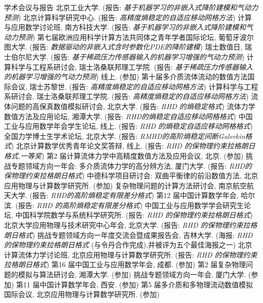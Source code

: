 %
\begin{rubric}{\songti 学术会议与报告}
%
\entry*[2023, 07.07] 北京工业大学. (报告: \emph{基于机器学习的非嵌入式降阶建模和气动力预测})
%
\entry*[2023, 07.06] 北京计算科学研究中心. (报告: \emph{高精度熵稳定的自适应移动网格方法})
%
\entry*[2023, 07.01] 计算与应用数学讨论班, 南方科技大学. (报告: \emph{基于机器学习的非嵌入式降阶建模和气动力预测})
%
\entry*[2023, 6.19-6.21] 第七届欧洲应用科学计算方法共同体之青年学者国际论坛, 葡萄牙波尔图大学. (报告: \emph{数据驱动的非嵌入式含时参数化PDE的降阶建模})
%
\entry*[2023, 6.07] 瑞士数值日, 瑞士伯尔尼大学. (报告: \emph{基于稀疏压力传感器输入的机器学习增强的气动力预测})
%
\entry*[2023, 6.05-6.06] 计算科学与工程系研讨会, 瑞士洛桑联邦理工学院. (报告: \emph{基于稀疏压力传感器输入的机器学习增强的气动力预测})
%
\entry*[] 线上. (参加)
%
\entry*[2022, 8.22-8.26] 第十届多介质流体流动的数值方法国际会议, 瑞士苏黎世. (报告: \emph{高精度熵稳定的自适应移动网格方法})
%
\entry*[2022, 6.27-6.29] 计算科学与工程系研讨会, 瑞士洛桑联邦理工学院. (报告: \emph{高精度熵稳定的自适应移动网格方法})
%
\entry*[2021, 6.05-6.07] 流体问题的高保真数值模拟研讨会, 北京大学. (报告: \emph{RHD 的熵稳定格式})
%
\entry*[2020, 12.11-12.13] 流体力学数值方法及应用论坛, 湘潭大学. (报告: \emph{RHD的熵稳定自适应移动网格格式})
%
\entry*[2020, 11.14-11.15] 中国工业与应用数学年会学生论坛, 线上. (报告: \emph{RHD 的熵稳定自适应移动网格格式})
%
\entry*[2020, 11.06-11.08] 全国力学博士生学术论坛, 北京大学. (报告: \emph{RMHD的高阶熵稳定间断Galerkin格式})
%
\entry*[2020, 8.30] 北京计算数学优秀青年论文奖答辩, 线上. (报告: \emph{RHD 的保物理约束拉格朗日格式,一等奖})
%
\entry*[2020, 1.10-1.13] 第2 届计算流体力学中高精度数值方法及应用会议, 北京. (参加)
%
\entry*[2019, 11.29-12.01] 挑战专题领域方向一年会: 多介质流体力学的高分辨方法, 厦门大学. (报告: \emph{RHD的保物理约束拉格朗日格式})
%
\entry*[2019, 9.25-9.27] 中德科学项目研讨会: 双曲平衡律的前沿数值方法, 北京应用物理与计算数学研究所. (参加)
%
\entry*[2020, 8.28-8.30] 复杂物理问题的计算方法研讨会, 南京航空航天大学. (报告: \emph{RHD的高阶熵稳定有限差分格式})
%
\entry*[2019, 7.31-8.04] 第12 届中国计算数学年会, 哈尔滨. (报告: \emph{RHD 的高阶熵稳定有限差分格式})
%
\entry*[2019, 6.22] 中国工业与应用数学学会研究生论坛, 中国科学院数学与系统科学研究所. (报告: \emph{RHD 的保物理约束拉格朗日格式})
%
\entry*[2018, 12.13] 北京大学应用物理与技术研究中心年会, 北京大学. (报告: \emph{RHD 的保物理约束拉格朗日格式})
%
\entry*[2018, 11.17-11.19] 挑战专题领域方向一年度交流会暨成果报告会, 吉林大学. (海报: \emph{RHD 的保物理约束拉格朗日格式} (与令丹合作完成),并被评为五个最佳海报之一)
%
\entry*[2018, 11.11] 北京计算流体力学讨论班, 北京应用物理与计算数学研究所. (报告: \emph{RHD 的保物理约束拉格朗日格式})
%
\entry*[2018, 9.13-9.16] 第16 届中国工业与应用数学年会, 成都. (参加)
%
\entry*[2018, 4.27-4.30] 第2 届复杂物理问题的模拟与算法研讨会, 湘潭大学. (参加)
%
\entry*[2017, 11.10-11.12] 挑战专题领域方向一年会, 厦门大学. (参加)
%
\entry*[2017, 7.21-7.23] 第11 届中国计算数学年会, 西安. (参加)
%
\entry*[2017, 7.03-7.07] 第5 届多介质和多物理流动数值模拟国际会议, 北京应用物理与计算数学研究所. (参加)
\end{rubric}

